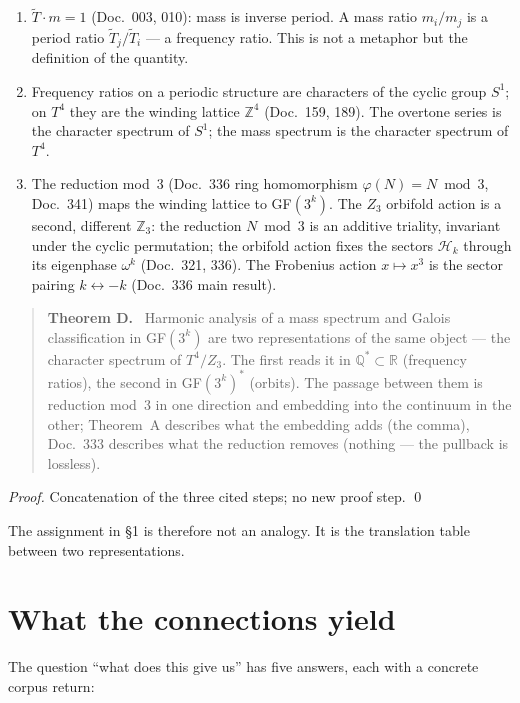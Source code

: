 \begin{enumerate}
\item $\tilde{T}\cdot m=1$ (Doc.~003, 010): mass is inverse period. A mass
  ratio $m_i/m_j$ is a period ratio $\tilde{T}_j/\tilde{T}_i$ --- a
  frequency ratio. This is not a metaphor but the definition of the quantity.
\item Frequency ratios on a periodic structure are characters of the
  cyclic group $S^1$; on $T^4$ they are the winding lattice $\mathbb{Z}^4$
  (Doc.~159, 189). The overtone series is the character spectrum of $S^1$;
  the mass spectrum is the character spectrum of $T^4$.
\item The reduction mod~3 (Doc.~336 ring homomorphism
  $\varphi(N)=N\bmod3$, Doc.~341) maps the winding lattice to
  GF$(3^k)$. The $Z_3$ orbifold action is a second, different
  $\mathbb{Z}_3$: the reduction $N\bmod 3$ is an additive triality,
  invariant under the cyclic permutation; the orbifold action fixes the
  sectors $\mathcal H_k$ through its eigenphase $\omega^k$ (Doc.~321, 336).
  The Frobenius action $x\mapsto x^3$ is the sector pairing
  $k\leftrightarrow-k$ (Doc.~336 main result).
\end{enumerate}

\begin{quote}
\textbf{Theorem D.} \BM\ Harmonic analysis of a mass spectrum and Galois
classification in GF$(3^k)$ are two representations of the same object
--- the character spectrum of $T^4/Z_3$. The first reads it in
$\mathbb{Q}^*\subset\mathbb{R}$ (frequency ratios), the second in
GF$(3^k)^*$ (orbits). The passage between them is reduction mod~3 in one
direction and embedding into the continuum in the other; Theorem~A
describes what the embedding adds (the comma), Doc.~333 describes what the
reduction removes (nothing --- the pullback is lossless).
\end{quote}

\emph{Proof.} Concatenation of the three cited steps; no new proof step. \qed

The assignment in §1 is therefore not an analogy. It is the translation
table between two representations.

\section{What the connections yield}

The question ``what does this give us'' has five answers, each with a
concrete corpus return:

